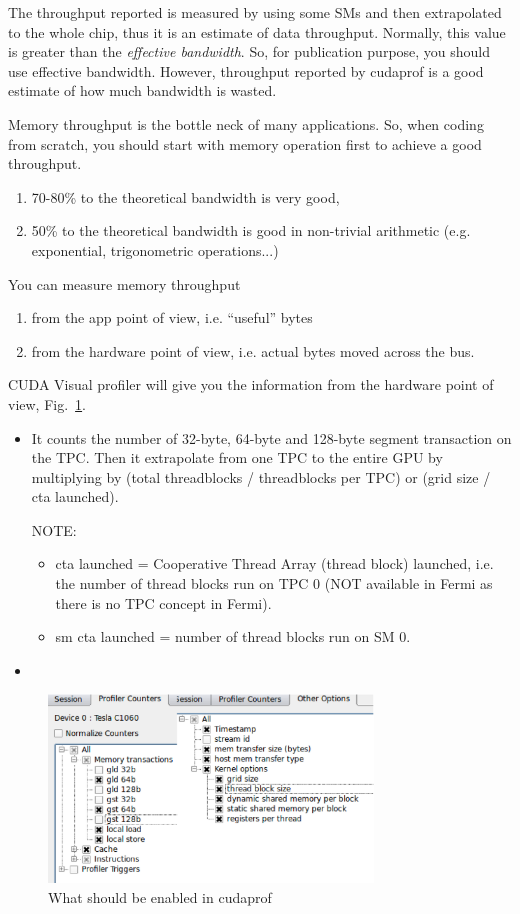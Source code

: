 The throughput reported is measured by using some SMs and then
extrapolated to the whole chip, thus it is an estimate of data
throughput. Normally, this value is greater than the {\it effective
  bandwidth}. So, for publication purpose, you should use effective
bandwidth. However, throughput reported by cudaprof is a good estimate
of how much bandwidth is wasted. 

Memory throughput is the bottle neck of many applications. So, when
coding from scratch, you should start with memory operation first to
achieve a good throughput.
\begin{enumerate}
\item 70-80\% to the theoretical bandwidth is very good, 
\item 50\% to the theoretical bandwidth is good in non-trivial
  arithmetic (e.g. exponential, trigonometric operations...)
\end{enumerate}
You can measure memory throughput 
\begin{enumerate}
\item from the app point of view, i.e. ``useful'' bytes
\item from the hardware point of view, i.e. actual bytes moved across
  the bus. 
\end{enumerate}

CUDA Visual profiler will give you the information from the hardware
point of view, Fig.~\ref{fig:cudaprof}. 
\begin{itemize}
\item It counts the number of 32-byte, 64-byte and 128-byte segment
  transaction on the TPC. Then it extrapolate from one TPC to the
  entire GPU by multiplying by (total threadblocks / threadblocks per
  TPC) or (grid size / cta launched). 

  NOTE: 
  \begin{itemize}
  \item cta launched = Cooperative Thread Array (thread block)
    launched, i.e. the number of thread blocks run on TPC 0 (NOT
    available in Fermi as there is no TPC concept in Fermi).
  \item sm cta launched = number of thread blocks run on SM 0.
  \end{itemize}
\item 
\end{itemize}

\begin{figure}[hbt]
  \centerline{\includegraphics[height=5cm,
    angle=0]{./images/cudaprof_check.eps}}
  \caption{What should be enabled in cudaprof}
  \label{fig:cudaprof}
\end{figure}

